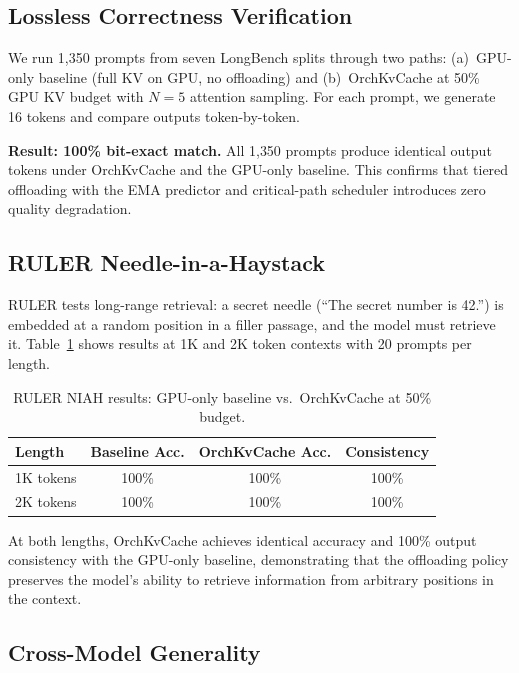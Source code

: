 \documentclass[acmsmall,nonacm,screen]{acmart}
\newcommand{\sys}{OrchKvCache}
\begin{document}
\subsection{Lossless Correctness Verification}\label{sec:eval:quality}

We run 1{,}350 prompts from seven LongBench splits through two paths:
(a)~GPU-only baseline (full KV on GPU, no offloading) and (b)~\sys{} at
50\% GPU KV budget with $N{=}5$ attention sampling.  For each prompt, we
generate 16 tokens and compare outputs token-by-token.

\textbf{Result: 100\% bit-exact match.}  All 1{,}350 prompts produce
identical output tokens under \sys{} and the GPU-only baseline.  This
confirms that tiered offloading with the EMA predictor and critical-path
scheduler introduces zero quality degradation.

\subsection{RULER Needle-in-a-Haystack}\label{sec:eval:ruler}

RULER tests long-range retrieval: a secret needle (``The secret number is
42.'') is embedded at a random position in a filler passage, and the model
must retrieve it.  Table~\ref{tab:ruler} shows results at 1K and 2K token
contexts with 20 prompts per length.

\begin{table}[t]
\centering
\caption{RULER NIAH results: GPU-only baseline vs.\ \sys{} at 50\% budget.}
\label{tab:ruler}
\begin{tabular}{lccc}
\toprule
\textbf{Length} & \textbf{Baseline Acc.} & \textbf{\sys{} Acc.} & \textbf{Consistency} \\
\midrule
1K tokens & 100\% & 100\% & 100\% \\
2K tokens & 100\% & 100\% & 100\% \\
\bottomrule
\end{tabular}
\end{table}

At both lengths, \sys{} achieves identical accuracy and 100\% output
consistency with the GPU-only baseline, demonstrating that the offloading
policy preserves the model's ability to retrieve information from arbitrary
positions in the context.

\subsection{Cross-Model Generality}\label{sec:eval:crossmodel}
\end{document}
